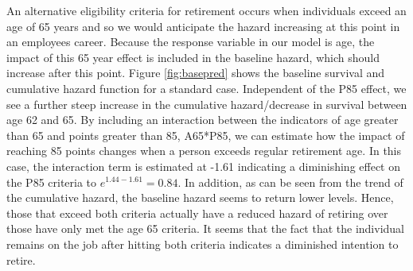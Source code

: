 \documentclass[12pt,letterpaper]{article}
\begin{document}
An alternative eligibility criteria for retirement occurs when individuals exceed an age of 65 years and so we would anticipate the hazard increasing at this point in an employees career.  Because the response variable in our model is age, the impact of this 65 year effect is included in the baseline hazard, which should increase after this point.  Figure \ref{fig:basepred} shows the baseline survival and cumulative hazard function for a standard case. Independent of the P85 effect, we see a further steep increase in the cumulative hazard/decrease in survival between age 62 and 65. By including an interaction between the indicators of age greater than 65 and points greater than 85, A65*P85, we can estimate how the impact of reaching 85 points changes when a person exceeds regular retirement age.  In this case, the interaction term is estimated at -1.61 indicating a diminishing effect on the P85 criteria to $e^{1.44-1.61} =0.84$.  In addition, as can be seen from the trend of the cumulative hazard, the baseline hazard seems to return lower levels.  Hence, those that exceed both criteria actually have a reduced hazard of retiring over those have only met the age 65 criteria.  It seems that the fact that the individual remains on the job after hitting both criteria indicates a diminished intention to retire.
\end{document}

